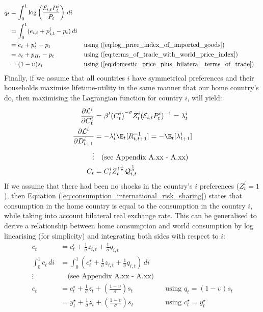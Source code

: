 \begin{align}
    q_t               & = \int_{0}^{1} \log \left( \frac{\mathcal{E}_{i,t}P_{t}^i}{P_t} \right) \, di                                                                           \\
    & = \int_{0}^{1} (e_{i,t} + p_{i,t}^i - p_t) \, di                              &  &                                                                      \\
    & = e_t + p_t^{\star} - p_t                                                     &  & \text{using (\ref{eq:log_price_index_of_imported_goods})}            \\
    & = s_t + p_{H_t} - p_t                                                         &  & \text{using (\ref{eq:terms_of_trade_with_world_price_index})}        \\
    & = (1-\upsilon)s_t                                                               &  & \text{using (\ref{eq:domestic_price_plus_bilateral_terms_of_trade})}
\end{align}
Finally, if we assume that all countries $i$ have symmetrical preferences and their households maximise lifetime-utility in the same manner that our home country's do, then maximising the Lagrangian function for country $i$, will yield:
\begin{align}
    \frac{\partial \mathcal{L}^i}{\partial C_t^i} &= \beta^t {(C^i_t)}^{-\sigma} Z^i_t(\mathcal{E}_{i,t}P^i_{t})^{-1} = \lambda^i_t \nonumber\\
    \frac{\partial \mathcal{L}^i}{\partial D_{t+1}^i} & = -\lambda^i_t \E_t[R^{-1}_{t,t+1}] = -\E_t[\lambda^i_{t+1}] \nonumber\\
    \vdots & \quad \text{(see Appendix A.xx - A.xx)} \\
    C_t  &= {C^i_t} {Z^i_t}^{\frac{1}{\sigma}} \mathcal{Q}_{i,t}^{\frac{1}{\sigma}} \label{eq:consumption_international_risk_sharing}
\end{align}
If we assume that there had been no shocks in the country's $i$ preferences ($Z^i_t = 1$), then Equation (\ref{eq:consumption_international_risk_sharing}) states that consumption in the home country is equal to the consumption in the country $i$, while taking into account bilateral real exchange rate. This can be generalised to derive a relationship between home consumption and world consumption by log linearising (for simplicity) and integrating both sides with respect to $i$:
\begin{align}
    c_t &= c_{t}^i + \frac{1}{\sigma}z_{i,t} + \frac{1}{\sigma}q_{i,t} \\
    \int_{0}^{1} c_t \, di & = \int_{0}^{1} \left( c_t^{\star} + \frac{1}{\sigma}z_{i,t} + \frac{1}{\sigma} q_{i,t}\right) \, di \\
    \vdots & \quad \text{(see Appendix A.xx - A.xx)} \\
    c_t & = c_t^{\star} + \frac{1}{\sigma}z_t + \left(\frac{1-\upsilon}{\sigma}\right)s_t \label{eq:link_between_consumption_and_world_consumption} &  & \text{using $q_t=(1-\upsilon)s_t$} \\
    & = y_t^{\star} + \frac{1}{\sigma}z_t + \left(\frac{1-\upsilon}{\sigma}\right)s_t \label{eq:link_between_consumption_and_world_output} &  & \text{using $c^{\star}_t=y^{\star}_t$} 
\end{align}
